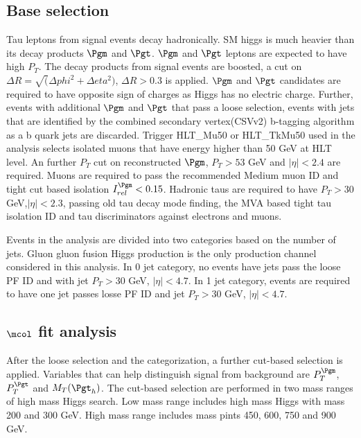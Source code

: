 \subsection{Base selection}
Tau leptons from signal events decay hadronically. SM higgs is much heavier than its decay products $\Pgm$ and $\Pgt$. $\Pgm$ and $\Pgt$ leptons are expected to have high $P_{T}$. The decay products from signal events are boosted, a cut on $\Delta R=\sqrt(\Delta phi^{2}+\Delta eta^{2})$, $\Delta R>0.3$ is applied. $\Pgm$ and $\Pgt$ candidates are required to have opposite sign of charges as Higgs has no electric charge. Further, events with additional $\Pgm$ and $\Pgt$ that pass a loose selection, events with jets that are identified by the combined secondary vertex(CSVv2) b-tagging algorithm \cite{btag_ago} as a b quark jets are discarded. Trigger HLT\_Mu50 or HLT\_TkMu50 used in the analysis selects isolated muons that have energy higher than 50 GeV at HLT level. An further $P_{T}$ cut on reconstructed $\Pgm$,  $P_{T}>53$ GeV and $|\eta|<2.4$ are required. Muons are required to pass the recommended Medium muon ID and tight cut based isolation $I^{\Pgm}_{rel}<0.15$. 
Hadronic taus are required to have $P_T>30$ GeV,$|\eta|<2.3$, passing old tau decay mode finding, the MVA based tight tau isolation ID and tau discriminators against electrons and muons. 

Events in the analysis are divided into two categories based on the number of jets. Gluon gluon fusion Higgs production is the only production channel considered in this analysis. In 0 jet category, no events have jets pass the loose PF ID and  with jet $P_T>30$ GeV, $|\eta|<4.7$. In 1 jet category, events are required to have one jet passes losse PF ID and jet $P_T>30$ GeV, $|\eta|<4.7$.


\subsection{$\mcol$ fit analysis}
After the loose selection and the categorization, a further cut-based selection is applied. Variables that can help distinguish signal from background are $P_{T}^{\Pgm}$, $P_{T}^{\Pgt}$ and $M_{T}(\Pgt_{h})$.
The cut-based selection are performed in two mass ranges of high mass Higgs search. Low mass range includes high mass Higgs with mass 200 and 300 GeV. High mass range includes mass pints 450, 600, 750 and 900 GeV.   


